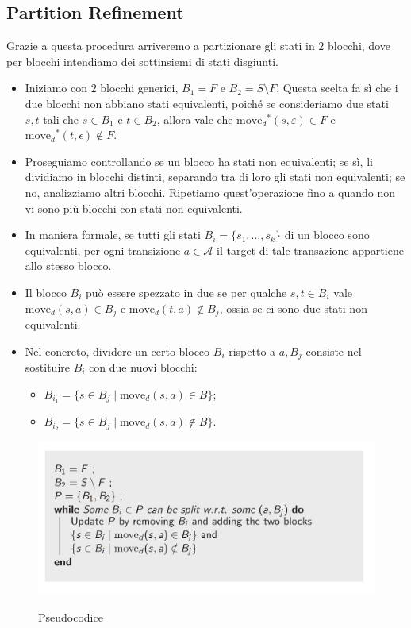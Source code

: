 \documentclass[class=book, crop=false, oneside, 12pt]{standalone}
\begin{document}
\subsection{Partition Refinement}
Grazie a questa procedura arriveremo a partizionare gli stati in \(2\) blocchi, dove per blocchi intendiamo dei sottinsiemi di stati disgiunti.

\begin{itemize}
    \item Iniziamo con \(2\) blocchi generici, \(B_{1}=F\) e \(B_{2}=S\setminus F\). Questa scelta fa sì che i due blocchi non abbiano stati equivalenti, poiché se consideriamo due stati \(s, t\) tali che \(s\in B_{1}\) e \(t\in B_{2}\), allora vale che \(\textrm{move}_{d}\!^{*}(s,\varepsilon)\in F\) e \(\textrm{move}_{d}\!^{*}(t,\epsilon)\notin F\).
    \item Proseguiamo controllando se un blocco ha stati non equivalenti; se sì, li dividiamo in blocchi distinti, separando tra di loro gli stati non equivalenti; se no, analizziamo altri blocchi. Ripetiamo quest'operazione fino a quando non vi sono più blocchi con stati non equivalenti.
    \item In maniera formale, se tutti gli stati \(B_{i}=\{s_{1}, \ldots, s_{k}\}\) di un blocco sono equivalenti, per ogni transizione \(a \in \mathcal{A}\) il target di tale transazione appartiene allo stesso blocco.
    \item Il blocco \(B_{i}\) può essere spezzato in due se per qualche \(s,t \in B_{i}\) vale \(\textrm{move}_{d}(s,a)\in B_{j}\) e \(\textrm{move}_{d}(t,a)\notin B_{j}\), ossia se ci sono due stati non equivalenti.
    \item Nel concreto, dividere un certo blocco \(B_{i}\) rispetto a \(a,B_{j}\) consiste nel sostituire \(B_{i}\) con due nuovi blocchi:
    \begin{itemize}
        \item \( B_{i_1} = \{s \in B_{j} \mid \textrm{move}_{d}(s,a)\in B\}\);
        \item \( B_{i_2} = \{s \in B_{j} \mid \textrm{move}_{d}(s,a)\notin B\}\).
    \end{itemize}
\end{itemize}

\begin{figure}[H]
	\centering
	\includegraphics[width=.8\textwidth,keepaspectratio]{algoritmo partiton refinement.png}
	\label{partition refinement}
	\caption{Pseudocodice}
\end{figure}
\end{document}
